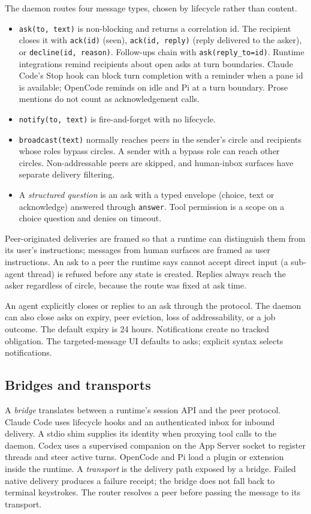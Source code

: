 \documentclass[10pt,twocolumn]{article}
\newcommand{\code}[1]{\texttt{#1}}
\begin{document}
The daemon routes four message types, chosen by lifecycle rather than content.
\begin{itemize}
\item \code{ask(to, text)} is non-blocking and returns a correlation id. The recipient closes it with \code{ack(id)} (seen), \code{ack(id, reply)} (reply delivered to the asker), or \code{decline(id, reason)}. Follow-ups chain with \code{ask(reply\_to=id)}. Runtime integrations remind recipients about open asks at turn boundaries. Claude Code's Stop hook can block turn completion with a reminder when a pane id is available; OpenCode reminds on idle and Pi at a turn boundary. Prose mentions do not count as acknowledgement calls.
\item \code{notify(to, text)} is fire-and-forget with no lifecycle.
\item \code{broadcast(text)} normally reaches peers in the sender's circle and recipients whose roles bypass circles. A sender with a bypass role can reach other circles. Non-addressable peers are skipped, and human-inbox surfaces have separate delivery filtering.
\item A \emph{structured question} is an ask with a typed envelope (choice, text or acknowledge) answered through \code{answer}. Tool permission is a scope on a choice question and denies on timeout.
\end{itemize}
Peer-originated deliveries are framed so that a runtime can distinguish them from its user's instructions; messages from human surfaces are framed as user instructions. An ask to a peer the runtime says cannot accept direct input (a sub-agent thread) is refused before any state is created. Replies always reach the asker regardless of circle, because the route was fixed at ask time.

An agent explicitly closes or replies to an ask through the protocol. The daemon can also close asks on expiry, peer eviction, loss of addressability, or a job outcome. The default expiry is 24 hours. Notifications create no tracked obligation. The targeted-message UI defaults to asks; explicit syntax selects notifications.

\subsection{Bridges and transports}
\label{sec:bridges}

A \emph{bridge} translates between a runtime's session API and the peer protocol. Claude Code uses lifecycle hooks and an authenticated inbox for inbound delivery. A stdio shim supplies its identity when proxying tool calls to the daemon. Codex uses a supervised companion on the App Server socket to register threads and steer active turns. OpenCode and Pi load a plugin or extension inside the runtime. A \emph{transport} is the delivery path exposed by a bridge. Failed native delivery produces a failure receipt; the bridge does not fall back to terminal keystrokes. The router resolves a peer before passing the message to its transport.
\end{document}

